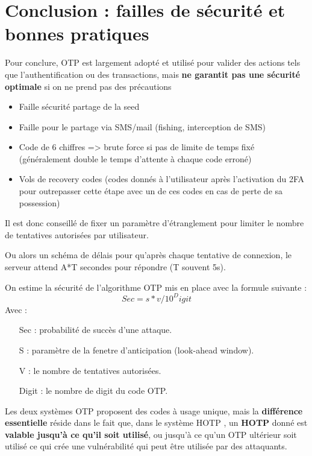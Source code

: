 \documentclass[a4paper, 10pt]{article}
\newcommand{\otp}{\textsc{OTP} }
\newcommand{\hotp}{\textsc{HOTP} }
\begin{document}
\newpage
    \section{Conclusion : failles de sécurité et bonnes pratiques}

Pour conclure, \otp est largement adopté et \textcolor{myblue}{utilisé pour valider des actions} tels que l’authentification ou des transactions, mais \textbf{ne garantit pas une sécurité optimale} si on ne prend pas des précautions
\begin{itemize}
    \item	Faille sécurité partage de la seed
    \item	Faille pour le partage via SMS/mail (fishing, interception de SMS)
    \item	Code de 6 chiffres => brute force si pas de limite de temps fixé (généralement double le temps d’attente à chaque code erroné)
    \item	Vols de recovery codes (codes donnés à l'utilisateur après l'activation du 2FA pour outrepasser cette étape avec un de ces codes en cas de perte de sa possession) 
\end{itemize}

Il est donc conseillé de fixer un \textcolor{mygreen}{paramètre d’étranglement} pour limiter le nombre de tentatives autorisées par utilisateur. 

Ou alors un \textcolor{mygreen}{schéma de délais} pour qu'après chaque tentative de connexion, le serveur attend \textcolor{mygreen}{A*T secondes} pour répondre (T souvent 5s).


On estime la sécurité de l'algorithme \otp mis en place avec la formule suivante :
\textcolor{myblue}{$$
Sec = s * v / 10^Digit
$$}
\noindent
Avec :
\begin{itemize}
    \item[Sec :] probabilité de succès d’une attaque.
    \item[S : ] paramètre de la fenetre d’anticipation (look-ahead window).
    \item[V : ] le nombre de tentatives autorisées.
    \item[Digit : ] le nombre de digit du code OTP.\\
\end{itemize}


Les deux systèmes \otp proposent des codes à usage unique, mais la \textbf{différence essentielle} réside dans le fait que, dans le système \hotp, un \textbf{\hotp} donné est \textbf{valable jusqu'à ce qu'il soit utilisé}, ou jusqu'à ce qu'un \otp ultérieur soit utilisé ce qui crée une vulnérabilité qui peut être utilisée par des attaquants. 
\end{document}
